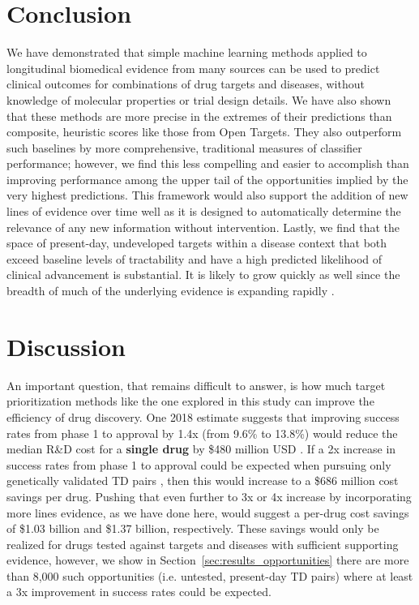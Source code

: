 \documentclass{article}
\begin{document}
\section{Conclusion}

We have demonstrated that simple machine learning methods applied to longitudinal biomedical evidence from many sources can be used to predict clinical outcomes for combinations of drug targets and diseases, without knowledge of molecular properties or trial design details. We have also shown that these methods are more precise in the extremes of their predictions than composite, heuristic scores like those from Open Targets. They also outperform such baselines by more comprehensive, traditional measures of classifier performance; however, we find this less compelling and easier to accomplish than improving performance among the upper tail of the opportunities implied by the very highest predictions. This framework would also support the addition of new lines of evidence over time well as it is designed to automatically determine the relevance of any new information without intervention.  Lastly, we find that the space of present-day, undeveloped targets within a disease context that both exceed baseline levels of tractability and have a high predicted likelihood of clinical advancement is substantial. It is likely to grow quickly as well since the breadth of much of the underlying evidence is expanding rapidly \cite{PMID:33214558,PMID:36634672,PMID:31491408}.

\section{Discussion}
\label{sec:discussion}

An important question, that remains difficult to answer, is how much target prioritization methods like the one explored in this study can improve the efficiency of drug discovery. One 2018 estimate suggests that improving success rates from phase 1 to approval by 1.4x (from 9.6\% to 13.8\%) would reduce the median R\&D cost for a \textbf{single drug} by \$480 million USD \cite{PMID:32125404}. If a 2x increase in success rates from phase 1 to approval could be expected when pursuing only genetically validated TD pairs \cite{Nelson2015-eg}, then this would increase to a \$686 million cost savings per drug. Pushing that even further to 3x or 4x increase by incorporating more lines evidence, as we have done here, would suggest a per-drug cost savings of \$1.03 billion and \$1.37 billion, respectively. These savings would only be realized for drugs tested against targets and diseases with sufficient supporting evidence, however, we show in Section~\ref{sec:results_opportunities} there are more than 8,000 such opportunities (i.e. untested, present-day TD pairs) where at least a 3x improvement in success rates could be expected.
\end{document}
